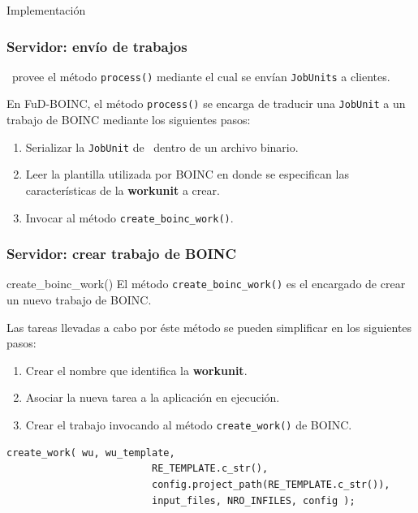 \begin{subsection}{Implementación}
	\begin{frame}\frametitle{Servidor: envío de trabajos}
		\begin{block}{}
			\fud \ provee el método \texttt{process()} mediante el cual se envían \texttt{JobUnits} a clientes.
		\end{block}
		\vspace{5mm}
		\pause
		En FuD-BOINC, el método \texttt{process()} se encarga de traducir una \texttt{JobUnit} a un trabajo de BOINC
		mediante los siguientes pasos:
		\vspace{5mm}
		\begin{enumerate}
		\addtolength{\itemsep}{2mm}
			\item Serializar la \texttt{JobUnit} de \fud \ dentro de un archivo binario.
			\item Leer la plantilla utilizada por BOINC en donde se especifican las características de la \textbf{workunit} a crear.
			\item Invocar al método \texttt{create\_boinc\_work()}.
		\end{enumerate}
	\end{frame}

	\begin{frame}[fragile]\frametitle{Servidor: crear trabajo de BOINC}
		\begin{block}{create\_boinc\_work()}
			El método \texttt{create\_boinc\_work()} es el encargado de crear un nuevo trabajo de BOINC.
		\end{block}
		Las tareas llevadas a cabo por éste método se pueden simplificar en los siguientes pasos:
		\begin{enumerate}
			\item Crear el nombre que identifica la \textbf{workunit}.
			\item Asociar la nueva tarea a la aplicación en ejecución.
			\item Crear el trabajo invocando al método \texttt{create\_work()} de BOINC.
		\end{enumerate}
		\vspace{2mm}
		\begin{lstlisting}[frame=single]   
			create_work( wu, wu_template,
			             RE_TEMPLATE.c_str(),
			             config.project_path(RE_TEMPLATE.c_str()),
			             input_files, NRO_INFILES, config );
		\end{lstlisting}
	\end{frame}


\end{subsection}
